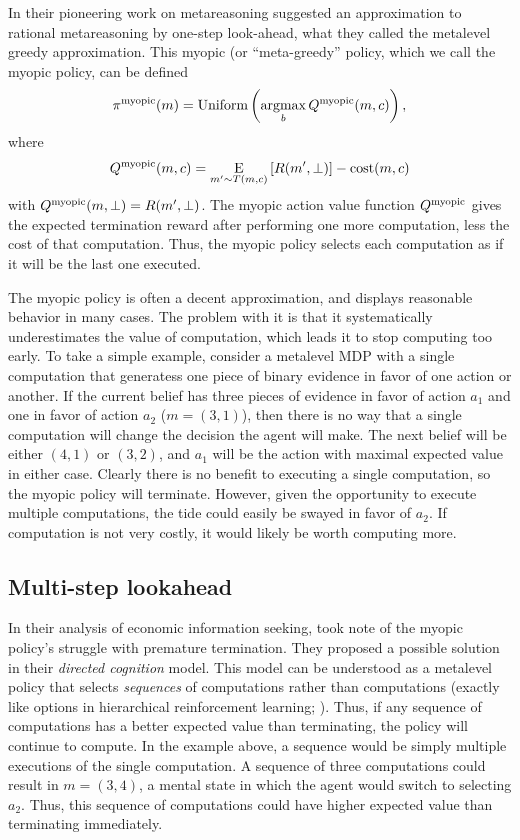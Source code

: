 In their pioneering work on metareasoning \citet{russell1991principles} suggested an approximation to rational metareasoning by one-step look-ahead, what they called the metalevel greedy approximation. This myopic (or ``meta-greedy'' policy, which we call the myopic policy, can be defined
\begin{equation}
  \pi^{\mathrm{myopic}}(m) = \text{Uniform}\left(\operatorname*{argmax}_b Q^{\mathrm{myopic}}(m, c)\right),
\end{equation}
where
\begin{equation}
Q^{\mathrm{myopic}}(m, c) = \operatorname*{E}_{m' \sim T(m, c)}\left[ 
  R(m', \bot)
\right] - \text{cost}(m, c)
\end{equation}
with $Q^{\mathrm{myopic}}(m, \bot) = R(m', \bot)$. The myopic action value function $Q^{\mathrm{myopic}}$ gives the expected termination reward after performing one more computation, less the cost of that computation. Thus, the myopic policy selects each computation as if it will be the last one executed.

The myopic policy is often a decent approximation, and displays reasonable behavior in many cases. The problem with it is that it systematically underestimates the value of computation, which leads it to stop computing too early. To take a simple example, consider a metalevel MDP with a single computation that generatess one piece of binary evidence in favor of one action or another. If the current belief has three pieces of evidence in favor of action $a_1$ and one in favor of action $a_2$ ($m = (3, 1)$), then there is no way that a single computation will change the decision the agent will make. The next belief will be either $(4, 1)$ or $(3, 2)$, and $a_1$ will be the action with maximal expected value in either case. Clearly there is no benefit to executing a single computation, so the myopic policy will terminate. However, given the opportunity to execute multiple computations, the tide could easily be swayed in favor of $a_2$. If computation is not very costly, it would likely be worth computing more. 


\subsection{Multi-step lookahead}

In their analysis of economic information seeking, \citet{gabaix2005bounded} took note of the myopic policy's struggle with premature termination. They proposed a possible solution in their \emph{directed cognition} model. This model can be understood as a metalevel policy that selects \emph{sequences} of computations rather than computations (exactly like options in hierarchical reinforcement learning; \citealp{sutton1999mdps}). Thus, if any sequence of computations has a better expected value than terminating, the policy will continue to compute. In the example above, a sequence would be simply multiple executions of the single computation. A sequence of three computations could result in $m=(3,4)$, a mental state in which the agent would switch to selecting $a_2$. Thus, this sequence of computations could have higher expected value than terminating immediately.

